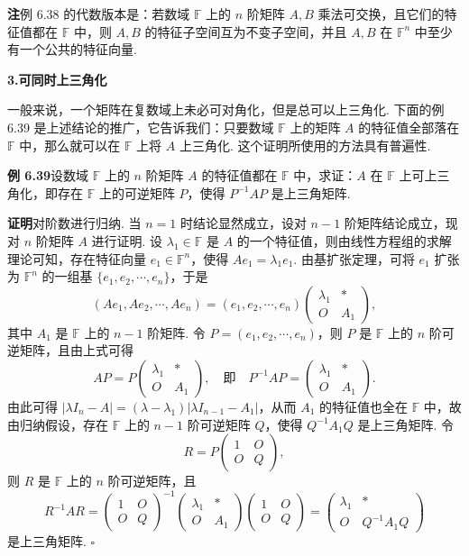 \documentclass[UTF8, 12pt, fontset=fandol, oneside]{ctexart}
\begin{document}
\noindent\textbf{注}\quad 例 6.38 的代数版本是：若数域 $\mathbb{F}$ 上的 $n$ 阶矩阵 $A,B$ 乘法可交换，且它们的特征值都在 $\mathbb{F}$ 中，则 $A,B$ 的特征子空间互为不变子空间，并且 $A,B$ 在 $\mathbb{F}^n$ 中至少有一个公共的特征向量.

\noindent\textbf{3.\quad 可同时上三角化}

一般来说，一个矩阵在复数域上未必可对角化，但是总可以上三角化. 下面的例 6.39 是上述结论的推广，它告诉我们：只要数域 $\mathbb{F}$ 上的矩阵 $A$ 的特征值全部落在 $\mathbb{F}$ 中，那么就可以在 $\mathbb{F}$ 上将 $A$ 上三角化. 这个证明所使用的方法具有普遍性.

\noindent\textbf{例 6.39}\quad 设数域 $\mathbb{F}$ 上的 $n$ 阶矩阵 $A$ 的特征值都在 $\mathbb{F}$ 中，求证：$A$ 在 $\mathbb{F}$ 上可上三角化，即存在 $\mathbb{F}$ 上的可逆矩阵 $P$，使得 $P^{-1}AP$ 是上三角矩阵.

\noindent\textbf{证明}\quad 对阶数进行归纳. 当 $n=1$ 时结论显然成立，设对 $n-1$ 阶矩阵结论成立，现对 $n$ 阶矩阵 $A$ 进行证明. 设 $\lambda_1\in\mathbb{F}$ 是 $A$ 的一个特征值，则由线性方程组的求解理论可知，存在特征向量 $e_1\in\mathbb{F}^n$，使得 $Ae_1=\lambda_1e_1$. 由基扩张定理，可将 $e_1$ 扩张为 $\mathbb{F}^n$ 的一组基 $\{e_1,e_2,\cdots,e_n\}$，于是
\[
(Ae_1,Ae_2,\cdots,Ae_n)=(e_1,e_2,\cdots,e_n)
\left(\begin{array}{cc}
\lambda_1 & *\\
O & A_1
\end{array}\right),
\]
其中 $A_1$ 是 $\mathbb{F}$ 上的 $n-1$ 阶矩阵. 令 $P=(e_1,e_2,\cdots,e_n)$，则 $P$ 是 $\mathbb{F}$ 上的 $n$ 阶可逆矩阵，且由上式可得
\[
AP=P\left(\begin{array}{cc}
\lambda_1 & *\\
O & A_1
\end{array}\right),
\quad\text{即}\quad
P^{-1}AP=\left(\begin{array}{cc}
\lambda_1 & *\\
O & A_1
\end{array}\right).
\]
由此可得 $|\lambda I_n-A|=(\lambda-\lambda_1)|\lambda I_{n-1}-A_1|$，从而 $A_1$ 的特征值也全在 $\mathbb{F}$ 中，故由归纳假设，存在 $\mathbb{F}$ 上的 $n-1$ 阶可逆矩阵 $Q$，使得 $Q^{-1}A_1Q$ 是上三角矩阵. 令
\[
R=P\left(\begin{array}{cc}
1 & O\\
O & Q
\end{array}\right),
\]
则 $R$ 是 $\mathbb{F}$ 上的 $n$ 阶可逆矩阵，且
\[
R^{-1}AR=
\left(\begin{array}{cc}
1 & O\\
O & Q
\end{array}\right)^{-1}
\left(\begin{array}{cc}
\lambda_1 & *\\
O & A_1
\end{array}\right)
\left(\begin{array}{cc}
1 & O\\
O & Q
\end{array}\right)
=\left(\begin{array}{cc}
\lambda_1 & *\\
O & Q^{-1}A_1Q
\end{array}\right)
\]
是上三角矩阵. $\square$
\end{document}
